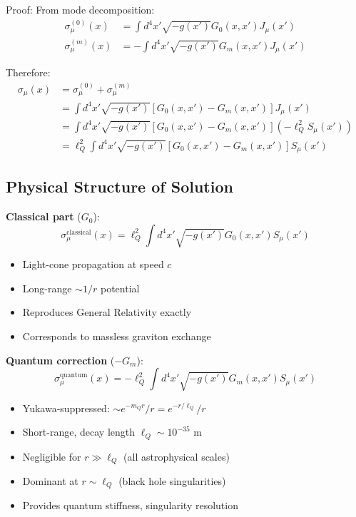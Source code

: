 \documentclass[11pt,a4paper]{article}
\theoremstyle{definition}
\theoremstyle{remark}
\begin{document}
		Proof:
			From mode decomposition:
			\begin{align}
				\sigma_\mu^{(0)}(x) &= \int d^4x'\sqrt{-g(x')}G_0(x,x')J_\mu(x')\\
				\sigma_\mu^{(m)}(x) &= -\int d^4x'\sqrt{-g(x')}G_m(x,x')J_\mu(x')
			\end{align}
			
			Therefore:
			\begin{align}
				\sigma_\mu(x) &= \sigma_\mu^{(0)} + \sigma_\mu^{(m)}\\
				&= \int d^4x'\sqrt{-g(x')}\left[G_0(x,x') - G_m(x,x')\right]J_\mu(x')\\
				&= \int d^4x'\sqrt{-g(x')}\left[G_0(x,x') - G_m(x,x')\right](-\ell_Q^2 S_\mu(x'))\\
				&= \ell_Q^2\int d^4x'\sqrt{-g(x')}\left[G_0(x,x') - G_m(x,x')\right]S_\mu(x')
			\end{align}
		
		\subsection{Physical Structure of Solution}
		
		\textbf{Classical part} ($G_0$):
		\begin{equation}
			\sigma_\mu^{\text{classical}}(x) = \ell_Q^2\int d^4x'\sqrt{-g(x')}G_0(x,x')S_\mu(x')
		\end{equation}
		\begin{itemize}
			\item Light-cone propagation at speed $c$
			\item Long-range $\sim 1/r$ potential
			\item Reproduces General Relativity exactly
			\item Corresponds to massless graviton exchange
		\end{itemize}
		
		\textbf{Quantum correction} ($-G_m$):
		\begin{equation}
			\sigma_\mu^{\text{quantum}}(x) = -\ell_Q^2\int d^4x'\sqrt{-g(x')}G_m(x,x')S_\mu(x')
		\end{equation}
		\begin{itemize}
			\item Yukawa-suppressed: $\sim e^{-m_Q r}/r = e^{-r/\ell_Q}/r$
			\item Short-range, decay length $\ell_Q \sim 10^{-35}$ m
			\item Negligible for $r \gg \ell_Q$ (all astrophysical scales)
			\item Dominant at $r \sim \ell_Q$ (black hole singularities)
			\item Provides quantum stiffness, singularity resolution
		\end{itemize}
		
\end{document}
